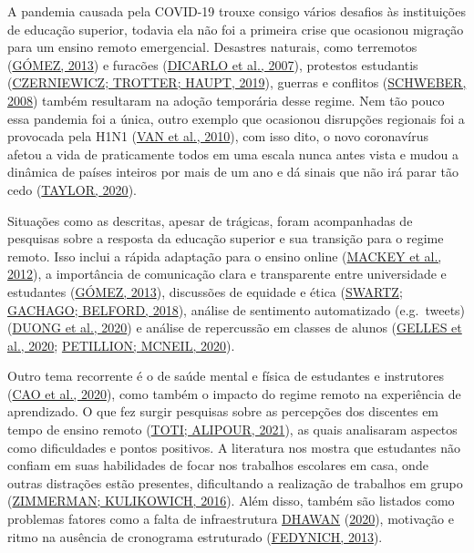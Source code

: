 \documentclass[
  12pt,
  portuguese,
]{article}
\begin{document}
A pandemia causada pela COVID-19 trouxe consigo vários desafios às
instituições de educação superior, todavia ela não foi a primeira crise
que ocasionou migração para um ensino remoto emergencial. Desastres
naturais, como terremotos
(\protect\hyperlink{ref-gomez2013lessons}{GÓMEZ, 2013}) e furacões
(\protect\hyperlink{ref-dicarlo2007survival}{DICARLO et al., 2007}),
protestos estudantis
(\protect\hyperlink{ref-czerniewicz2019online}{CZERNIEWICZ; TROTTER;
HAUPT, 2019}), guerras e conflitos
(\protect\hyperlink{ref-schweber2008determined}{SCHWEBER, 2008}) também
resultaram na adoção temporária desse regime. Nem tão pouco essa
pandemia foi a única, outro exemplo que ocasionou disrupções regionais
foi a provocada pela H1N1 (\protect\hyperlink{ref-van2010university}{VAN
et al., 2010}), com isso dito, o novo coronavírus afetou a vida de
praticamente todos em uma escala nunca antes vista e mudou a dinâmica de
países inteiros por mais de um ano e dá sinais que não irá parar tão
cedo (\protect\hyperlink{ref-timeline}{TAYLOR, 2020}).

Situações como as descritas, apesar de trágicas, foram acompanhadas de
pesquisas sobre a resposta da educação superior e sua transição para o
regime remoto. Isso inclui a rápida adaptação para o ensino online
(\protect\hyperlink{ref-mackey2012blended}{MACKEY et al., 2012}), a
importância de comunicação clara e transparente entre universidade e
estudantes (\protect\hyperlink{ref-gomez2013lessons}{GÓMEZ, 2013}),
discussões de equidade e ética
(\protect\hyperlink{ref-swartz2018care}{SWARTZ; GACHAGO; BELFORD,
2018}), análise de sentimento automatizado (e.g.~tweets)
(\protect\hyperlink{ref-duong2020ivory}{DUONG et al., 2020}) e análise
de repercussão em classes de alunos
(\protect\hyperlink{ref-compassionate}{GELLES et al., 2020};
\protect\hyperlink{ref-petillion2020student}{PETILLION; MCNEIL, 2020}).

Outro tema recorrente é o de saúde mental e física de estudantes e
instrutores (\protect\hyperlink{ref-cao2020psychological}{CAO et al.,
2020}), como também o impacto do regime remoto na experiência de
aprendizado. O que fez surgir pesquisas sobre as percepções dos
discentes em tempo de ensino remoto
(\protect\hyperlink{ref-toti2021}{TOTI; ALIPOUR, 2021}), as quais
analisaram aspectos como dificuldades e pontos positivos. A literatura
nos mostra que estudantes não confiam em suas habilidades de focar nos
trabalhos escolares em casa, onde outras distrações estão presentes,
dificultando a realização de trabalhos em grupo
(\protect\hyperlink{ref-zimmerman2016online}{ZIMMERMAN; KULIKOWICH,
2016}). Além disso, também são listados como problemas fatores como a
falta de infraestrutura \protect\hyperlink{ref-dhawan2020online}{DHAWAN}
(\protect\hyperlink{ref-dhawan2020online}{2020}), motivação e ritmo na
ausência de cronograma estruturado
(\protect\hyperlink{ref-fedynich2013teaching}{FEDYNICH, 2013}).
\end{document}

